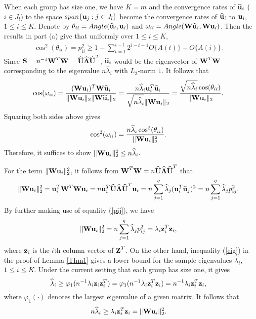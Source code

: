 \documentclass{statsoc}
\newcommand{\bu}{\mbox{\bf u}}
\newcommand{\bz}{\mbox{\bf z}}
\newcommand{\bS}{\mbox{\bf S}}
\newcommand{\bU}{\mbox{\bf U}}
\newcommand{\bW}{\mbox{\bf W}}
\newcommand{\bZ}{\mbox{\bf Z}}
\newcommand{\bLambda}{\mbox{\boldmath $\Lambda$}}
\def\t{^T}
\begin{document}
When each group has size one, we have $K = m$ and the convergence rates of $\widehat{\bu}_i$ ($i \in J_l$) to the space $span\{\bu_j: j \in J_l\}$ become the convergence rates of $\widehat{\bu}_i$ to $\bu_i$, $1 \leq i \leq K$. Denote by $\theta_{ii} = Angle(\widehat{\bu}_i, \bu_i)$ and $\omega_{ii} = Angle(\bW \widehat{\bu}_i, \bW \bu_i)$. Then the results in part (a) give that uniformly over $1 \leq i \leq K$,
\begin{align}\label{oii}
\cos^2(\theta_{ii}) =  p_{ii}^2 \geq 1 - \sum_{t = 1}^{i - 1} 2^{i - t - 1} O\{A(t)\} - O\{A(i)\}.
\end{align}
Since $\bS = n^{-1}\bW\t \bW = \widehat{\bU} \widehat{\bLambda} \widehat{\bU}\t$, $\widehat{\bu}_i$ would be the eigenvector of $\bW\t \bW$ corresponding to the eigenvalue $n \widehat{\lambda}_i$ with $L_2$-norm $1$. It follows that
\begin{equation*}\label{omega12}
\cos(\omega_{ii}) = \frac{(\bW \bu_i)\t \bW \widehat{\bu}_i}{\|\bW \bu_i\|_2 \|\bW \widehat{\bu}_i\|_2} = \frac{n \widehat{\lambda}_i \bu_i\t \widehat{\bu}_i}{\sqrt{n \widehat{\lambda}_i} \|\bW \bu_i\|_2} = \frac{\sqrt{n \widehat{\lambda}_i} \cos(\theta_{ii})}{\|\bW \bu_i\|_2}.
\end{equation*}
Squaring both sides above gives
\begin{align}\label{wii}
\cos^2(\omega_{ii}) = \frac{n \widehat{\lambda}_i \cos^2(\theta_{ii})}{\|\bW \bu_i\|_2^2}.
\end{align}
Therefore, it suffices to show $\|\bW \bu_i\|_2^2 \leq n \widehat{\lambda}_i$.

For the term $\|\bW \bu_i\|_2^2$, it follows from $\bW\t \bW = n \widehat{\bU} \widehat{\bLambda} \widehat{\bU}\t$ that
\begin{align*}
\|\bW \bu_i\|_2^2 = \bu_i\t \bW\t \bW \bu_i = n \bu_i\t \widehat{\bU} \widehat{\bLambda} \widehat{\bU}\t \bu_i = n \sum_{j = 1}^q \widehat{\lambda}_j (\bu_i\t \widehat{\bu}_j)^2 = n \sum_{j = 1}^q \widehat{\lambda}_j p_{ij}^2.
\end{align*}
By further making use of equality (\ref{pij}), we have
\begin{align*}
\|\bW \bu_i\|_2^2 = n\sum_{j = 1}^q \widehat{\lambda}_j p_{ij}^2 = \lambda_i \bz_i\t \bz_i,
\end{align*}
where $\bz_i$ is the $i$th column vector of $\bZ\t$. On the other hand, inequality (\ref{eig}) in the proof of Lemma \ref{Thm1} gives a lower bound for the sample eigenvalues $\widehat{\lambda}_i$, $1 \leq i \leq K$. Under the current setting that each group has size one, it gives
\[\widehat{\lambda}_i \geq \varphi_{1}(n^{-1} \lambda_i \bz_i \bz_i\t) = \varphi_{1}(n^{-1} \lambda_i \bz_i\t \bz_i) = n^{-1} \lambda_i \bz_i\t \bz_i,\]
where $\varphi_1 (\cdot)$ denotes the largest eigenvalue of a given matrix. It follows that
\[n \widehat{\lambda}_i \geq \lambda_i \bz_i\t \bz_i = \|\bW \bu_i\|_2^2.\]
\end{document}

